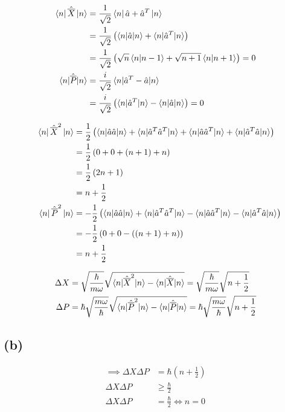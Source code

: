 \documentclass[letter, 10pts]{article}
\newcommand{\hb}{\hbar}
\begin{document}
\begin{align*}
\bra{n} \hat{\overline{X}} \ket{n} &= 
\frac{1}{\sqrt{2} }
\bra{n} \hat{a} + \hat{a}^{T} \ket{n}
\\
&= \frac{1}{\sqrt{2} }
\left(
\braket{n | \hat{a} | n} + 
\braket{n | \hat{a}^{T} | n }
\right) \\
&= 
\frac{1}{\sqrt{2} }
\left(
\sqrt{n} \braket{n | n-1} +
\sqrt{n+1} \braket{n | n+1}
\right) = 0
\\
\braket{n | \hat{\overline{P}} | n} &= 
\frac{i}{\sqrt{2} } 
\braket{n | \hat{a}^{T} - \hat{a} | n}
\\
				    &=
\frac{i}{\sqrt{2} } 
\left(
\braket{n | \hat{a}^{T} | n} - 
\braket{n | \hat{a} | n}
\right) = 0
\end{align*}


\begin{align*}
\bra{n} \hat{\overline{X}}^2  \ket{ n} 
&= 
\frac{1}{2}
\left(
\braket{ n | \hat{a} \hat{a} | n}
+
\braket{n | \hat{a}^{T} \hat{a}^{T} | n} 
+ 
\braket{n | \hat{a} \hat{a}^{T} | n	}
+
\braket{n | \hat{a}^{T} \hat{a} | n} 
\right)\\
&= 
\frac{1}{2}
\left(
0 + 0 + (n+1) + n 
\right)
\\
&= 
\frac{1}{2} 
\left(2n + 1\right)
\\
&= n + \frac{1}{2}  \\
\
\
\
\bra{n} \hat{\overline{P}} ^2 \ket{ n} 
&= -
\frac{1}{2}
\left(
\braket{ n | \hat{a} \hat{a} | n}
+
\braket{n | \hat{a}^{T} \hat{a}^{T} | n} 
- 
\braket{n | \hat{a} \hat{a}^{T} | n	}
-
\braket{n | \hat{a}^{T} \hat{a} | n} 
\right)\\
&= - \frac{1}{2} 
\left(
0 + 0 - \left(
	(n+1) + n
\right)
\right)\\
& = n + \frac{1}{2}
\end{align*}



\begin{align*}
\Delta X  
&= \sqrt{\frac{\hb}{m \omega}} 
\sqrt{
\braket{n | \hat{\overline{X}}^2 | n }
-
\braket{n | \hat{\overline{X} } | n}
} = \sqrt{\frac{\hb}{m \omega } } 
\sqrt{n + \frac{1}{2}} \\
\Delta P  
&= \hb \sqrt{\frac{m \omega }{\hb}}  
\sqrt{
\braket{n | \hat{\overline{P}}^2 | n }
-
\braket{n | \hat{\overline{P} } | n}
} = \hb \sqrt{\frac{m \omega }{ \hb } } 
\sqrt{n + \frac{1}{2}} \\
\end{align*}


\subsection*{(b)}
\begin{align*} \implies
	\Delta X \Delta P &= \hb \left(n + \frac{1}{2}\right) \\ 
	\Delta X \Delta P &\ge \frac{\hb}{2} \\ 
	\Delta X \Delta P &= \frac{\hb}{2} \iff  n = 0
\end{align*}
\end{document}
